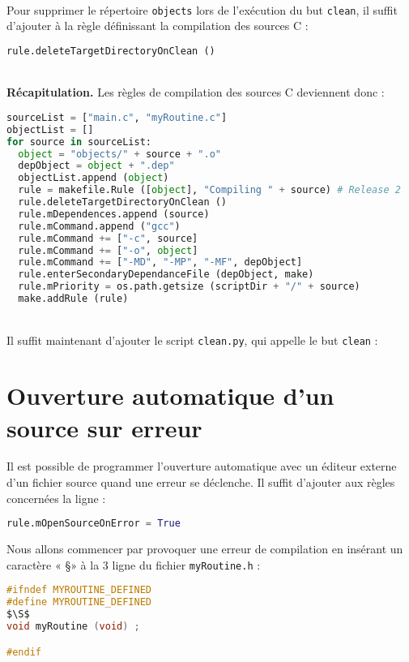 \documentclass[a4paper,11pt]{extarticle}
\begin{document}
~\\Pour supprimer le répertoire \texttt{objects} lors de l'exécution du but \texttt{clean}, il suffit d'ajouter à la règle définissant la compilation des sources C :

\begin{lstlisting}[language=py]
  rule.deleteTargetDirectoryOnClean ()
\end{lstlisting}

~\\{\bf Récapitulation.} Les règles de compilation des sources C deviennent donc :
\begin{lstlisting}[language=py]
sourceList = ["main.c", "myRoutine.c"]
objectList = []
for source in sourceList:
  object = "objects/" + source + ".o"
  depObject = object + ".dep"
  objectList.append (object)
  rule = makefile.Rule ([object], "Compiling " + source) # Release 2
  rule.deleteTargetDirectoryOnClean ()
  rule.mDependences.append (source)
  rule.mCommand.append ("gcc")
  rule.mCommand += ["-c", source]
  rule.mCommand += ["-o", object]
  rule.mCommand += ["-MD", "-MP", "-MF", depObject]
  rule.enterSecondaryDependanceFile (depObject, make)
  rule.mPriority = os.path.getsize (scriptDir + "/" + source)
  make.addRule (rule)
\end{lstlisting}

~\\Il suffit maintenant d'ajouter le script \texttt{clean.py}, qui appelle le but \texttt{clean} :












\section{Ouverture automatique d'un source sur erreur}

Il est possible de programmer l'ouverture automatique avec un éditeur externe d'un fichier source quand une erreur se déclenche. Il suffit d'ajouter aux règles concernées la ligne :
\begin{lstlisting}[language=py]
  rule.mOpenSourceOnError = True
\end{lstlisting}


Nous allons commencer par provoquer une erreur de compilation en insérant un caractère « \S » à la 3 ligne du fichier \texttt{myRoutine.h} :
\begin{lstlisting}[mathescape,language=C]
#ifndef MYROUTINE_DEFINED
#define MYROUTINE_DEFINED
$\S$
void myRoutine (void) ;

#endif
\end{lstlisting}
\end{document}
